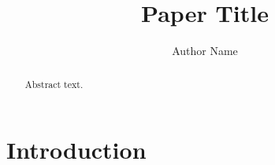 \documentclass[preprint,12pt]{elsarticle}
\begin{document}
\begin{frontmatter}
\title{Paper Title}
\author{Author Name}
\begin{abstract}
Abstract text.
\end{abstract}
\end{frontmatter}
\section{Introduction}
\end{document}

